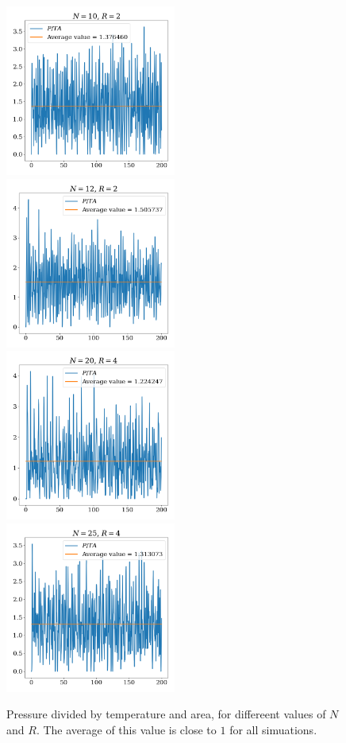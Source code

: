 \documentclass{article}
\begin{document}
        \begin{figure}[!b]

            \includegraphics[width = 0.5\textwidth]{pressure_10_particles_R_2}
            \includegraphics[width = 0.5\textwidth]{pressure_12_particles_R_2}
            \includegraphics[width = 0.5\textwidth]{pressure_20_particles_R_4}
            \includegraphics[width = 0.5\textwidth]{pressure_25_particles_R_4}
            \caption{Pressure divided by temperature and area, for differeent values of $N$ and $R$. The average of this value is close to $1$ for all simuations.}
            \label{ideal gas}

        \end{figure}
\end{document}
